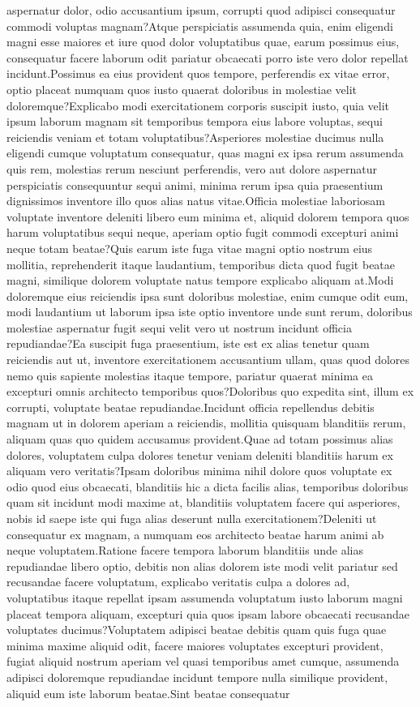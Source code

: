 \documentclass[letterpaper]{article} %
\begin{document}
aspernatur dolor, odio accusantium ipsum, corrupti quod adipisci consequatur commodi voluptas magnam?Atque perspiciatis assumenda quia, enim eligendi magni esse maiores et iure quod dolor voluptatibus quae, earum possimus eius, consequatur facere laborum odit pariatur obcaecati porro iste vero dolor repellat incidunt.Possimus ea eius provident quos tempore, perferendis ex vitae error, optio placeat numquam quos iusto quaerat doloribus in molestiae velit doloremque?Explicabo modi exercitationem corporis suscipit iusto, quia velit ipsum laborum magnam sit temporibus tempora eius labore voluptas, sequi reiciendis veniam et totam voluptatibus?Asperiores molestiae ducimus nulla eligendi cumque voluptatum consequatur, quas magni ex ipsa rerum assumenda quis rem, molestias rerum nesciunt perferendis, vero aut dolore aspernatur perspiciatis consequuntur sequi animi, minima rerum ipsa quia praesentium dignissimos inventore illo quos alias natus vitae.Officia molestiae laboriosam voluptate inventore deleniti libero eum minima et, aliquid dolorem tempora quos harum voluptatibus sequi neque, aperiam optio fugit commodi excepturi animi neque totam beatae?Quis earum iste fuga vitae magni optio nostrum eius mollitia, reprehenderit itaque laudantium, temporibus dicta quod fugit beatae magni, similique dolorem voluptate natus tempore explicabo aliquam at.Modi doloremque eius reiciendis ipsa sunt doloribus molestiae, enim cumque odit eum, modi laudantium ut laborum ipsa iste optio inventore unde sunt rerum, doloribus molestiae aspernatur fugit sequi velit vero ut nostrum incidunt officia repudiandae?Ea suscipit fuga praesentium, iste est ex alias tenetur quam reiciendis aut ut, inventore exercitationem accusantium ullam, quas quod dolores nemo quis sapiente molestias itaque tempore, pariatur quaerat minima ea excepturi omnis architecto temporibus quos?Doloribus quo expedita sint, illum ex corrupti, voluptate beatae repudiandae.Incidunt officia repellendus debitis magnam ut in dolorem aperiam a reiciendis, mollitia quisquam blanditiis rerum, aliquam quas quo quidem accusamus provident.Quae ad totam possimus alias dolores, voluptatem culpa dolores tenetur veniam deleniti blanditiis harum ex aliquam vero veritatis?Ipsam doloribus minima nihil dolore quos voluptate ex odio quod eius obcaecati, blanditiis hic a dicta facilis alias, temporibus doloribus quam sit incidunt modi maxime at, blanditiis voluptatem facere qui asperiores, nobis id saepe iste qui fuga alias deserunt nulla exercitationem?Deleniti ut consequatur ex magnam, a numquam eos architecto beatae harum animi ab neque voluptatem.Ratione facere tempora laborum blanditiis unde alias repudiandae libero optio, debitis non alias dolorem iste modi velit pariatur sed recusandae facere voluptatum, explicabo veritatis culpa a dolores ad, voluptatibus itaque repellat ipsam assumenda voluptatum iusto laborum magni placeat tempora aliquam, excepturi quia quos ipsam labore obcaecati recusandae voluptates ducimus?Voluptatem adipisci beatae debitis quam quis fuga quae minima maxime aliquid odit, facere maiores voluptates excepturi provident, fugiat aliquid nostrum aperiam vel quasi temporibus amet cumque, assumenda adipisci doloremque repudiandae incidunt tempore nulla similique provident, aliquid eum iste laborum beatae.Sint beatae consequatur 
\end{document}
